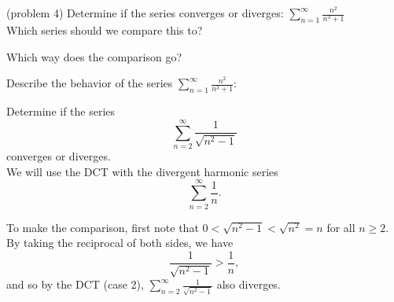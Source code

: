 \documentclass[handout]{ximera}
\begin{document}
\begin{problem}(problem 4)
Determine if the series converges or diverges: $\displaystyle{\sum_{n=1}^\infty \frac{n^2}{n^3 + 1}}$\\
Which series should we compare this to?

\begin{multipleChoice}
\end{multipleChoice}

Which way does the comparison go?
\begin{multipleChoice}
\end{multipleChoice}

Describe the behavior of the series $\sum_{n=1}^\infty \frac{n^2}{n^3 + 1}:$
\begin{multipleChoice}
\end{multipleChoice}

\end{problem}



\begin{example}[example 5]
Determine if the series 
\[
\sum_{n=2}^\infty \frac{1}{\sqrt{n^2 -1}}
\]
 converges or diverges.\\
We will use the DCT with the divergent harmonic series 
\[
\sum_{n=2}^\infty \frac{1}{n}.
\]

To make the comparison, first note that $0 < \sqrt{n^2 -1} < \sqrt{n^2} = n$ for all $n \geq 2$. By taking the reciprocal of both sides,
we have 
\[
\frac{1}{\sqrt{n^2 -1}} > \frac{1}{n},
\]
and so by the DCT (case 2), $\sum_{n=2}^\infty \frac{1}{\sqrt{n^2 -1}}$ also diverges.
\end{example}
\end{document}
